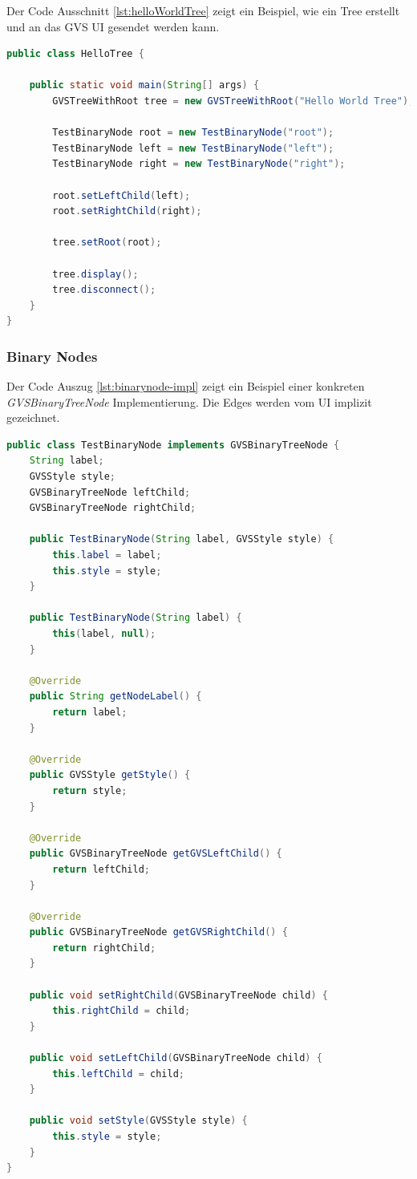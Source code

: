 \documentclass[11pt,a4paper,english,oneside]{book}
\numberwithin{equation}{chapter}
\begin{document}
	\noindent
	Der Code Ausschnitt \ref{lst:helloWorldTree} zeigt ein Beispiel, wie ein Tree erstellt und an das GVS UI gesendet werden kann.
	
\begin{lstlisting}[language=java, frame=single, caption={Hello World Tree}, label={lst:helloWorldTree}]
public class HelloTree {
	
	public static void main(String[] args) {
		GVSTreeWithRoot tree = new GVSTreeWithRoot("Hello World Tree");
		
		TestBinaryNode root = new TestBinaryNode("root");
		TestBinaryNode left = new TestBinaryNode("left");
		TestBinaryNode right = new TestBinaryNode("right");
		
		root.setLeftChild(left);
		root.setRightChild(right);
		
		tree.setRoot(root);
		
		tree.display();
		tree.disconnect();
	}
}

\end{lstlisting}

\clearpage

	\subsubsection{Binary Nodes}
	Der Code Auszug \ref{lst:binarynode-impl} zeigt ein Beispiel einer konkreten \textit{GVSBinaryTreeNode} Implementierung. Die Edges werden vom UI implizit gezeichnet.

\begin{lstlisting}[language=java, frame=single, caption={Binary Node Implementierung}, label={lst:binarynode-impl}]
public class TestBinaryNode implements GVSBinaryTreeNode {
	String label;
	GVSStyle style;
	GVSBinaryTreeNode leftChild;
	GVSBinaryTreeNode rightChild;
	
	public TestBinaryNode(String label, GVSStyle style) {
		this.label = label;
		this.style = style;
	}
	
	public TestBinaryNode(String label) {
		this(label, null);
	}
	
	@Override
	public String getNodeLabel() {
		return label;
	}
	
	@Override
	public GVSStyle getStyle() {
		return style;
	}
	
	@Override
	public GVSBinaryTreeNode getGVSLeftChild() {
		return leftChild;
	}
	
	@Override
	public GVSBinaryTreeNode getGVSRightChild() {
		return rightChild;
	}
	
	public void setRightChild(GVSBinaryTreeNode child) {
		this.rightChild = child;
	}
	
	public void setLeftChild(GVSBinaryTreeNode child) {
		this.leftChild = child;
	}
	
	public void setStyle(GVSStyle style) {
		this.style = style;
	}
}
\end{lstlisting}
\end{document}
